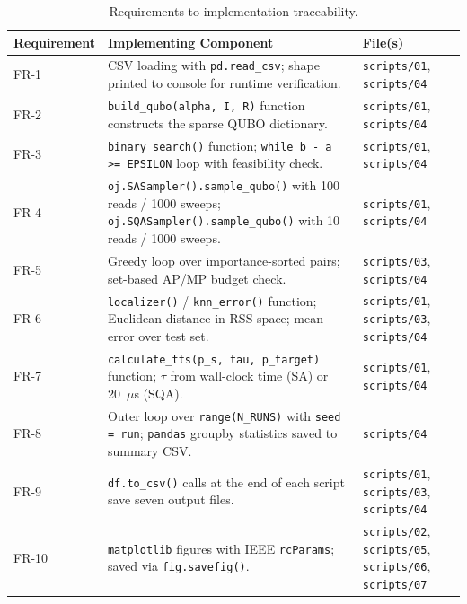 \documentclass[12pt,a4paper]{article}
\begin{document}
\begin{table}[h!]
\centering
\renewcommand{\arraystretch}{1.4}
\begin{tabular}{@{}lp{8.5cm}l@{}}
\toprule
\textbf{Requirement} & \textbf{Implementing Component} & \textbf{File(s)} \\
\midrule
FR-1 &
    CSV loading with \texttt{pd.read\_csv}; shape printed to console
    for runtime verification. &
    \texttt{scripts/01}, \texttt{scripts/04} \\

FR-2 &
    \texttt{build\_qubo(alpha, I, R)} function constructs the sparse
    QUBO dictionary. &
    \texttt{scripts/01}, \texttt{scripts/04} \\

FR-3 &
    \texttt{binary\_search()} function; \texttt{while b - a >= EPSILON}
    loop with feasibility check. &
    \texttt{scripts/01}, \texttt{scripts/04} \\

FR-4 &
    \texttt{oj.SASampler().sample\_qubo()} with 100 reads / 1000 sweeps;
    \texttt{oj.SQASampler().sample\_qubo()} with 10 reads / 1000 sweeps. &
    \texttt{scripts/01}, \texttt{scripts/04} \\

FR-5 &
    Greedy loop over importance-sorted pairs; set-based AP/MP budget check. &
    \texttt{scripts/03}, \texttt{scripts/04} \\

FR-6 &
    \texttt{localizer()} / \texttt{knn\_error()} function; Euclidean
    distance in RSS space; mean error over test set. &
    \texttt{scripts/01}, \texttt{scripts/03}, \texttt{scripts/04} \\

FR-7 &
    \texttt{calculate\_tts(p\_s, tau, p\_target)} function;
    $\tau$ from wall-clock time (SA) or 20~$\mu$s (SQA). &
    \texttt{scripts/01}, \texttt{scripts/04} \\

FR-8 &
    Outer loop over \texttt{range(N\_RUNS)} with \texttt{seed = run};
    \texttt{pandas} groupby statistics saved to summary CSV. &
    \texttt{scripts/04} \\

FR-9 &
    \texttt{df.to\_csv()} calls at the end of each script save seven
    output files. &
    \texttt{scripts/01}, \texttt{scripts/03}, \texttt{scripts/04} \\

FR-10 &
    \texttt{matplotlib} figures with IEEE \texttt{rcParams};
    saved via \texttt{fig.savefig()}. &
    \texttt{scripts/02}, \texttt{scripts/05},
    \texttt{scripts/06}, \texttt{scripts/07} \\
\bottomrule
\end{tabular}
\caption{Requirements to implementation traceability.}
\end{table}
\end{document}
